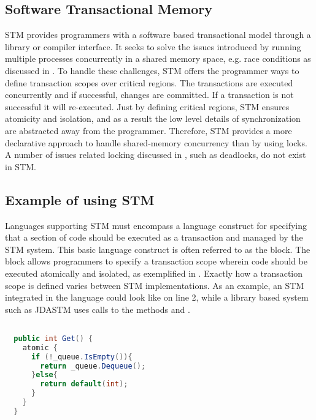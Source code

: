\subsection{Software Transactional Memory}
\ac{STM} provides programmers with a software based transactional model through a library or compiler interface\cite{herlihy2011tm}. It seeks to solve the issues introduced by running multiple processes concurrently in a shared memory space, e.g. race conditions as discussed in \cite[p. 22-26]{dpt907e14trending}. To handle these challenges, \ac{STM} offers the programmer ways to define transaction scopes over critical regions. The transactions are executed concurrently and if successful, changes are committed. If a transaction is not successful it will re-executed. Just by defining critical regions, \ac{STM} ensures atomicity and isolation, and as a result the low level details of synchronization are abstracted away from the programmer\cite[p. 48]{harris2005composable}. Therefore, \ac{STM} provides a more declarative approach to handle shared-memory concurrency than by using locks. A number of issues related locking discussed in \cite[p. 26-30]{dpt907e14trending}, such as deadlocks, do not exist in \ac{STM}.

\subsection{Example of using STM}
\label{sec:stm_keyconcepts_example}
Languages supporting \ac{STM} must encompass a language construct for specifying that a section of code should be executed as a transaction and managed by the \ac{STM} system. This basic language construct is often referred to as the  block\cite[p. 49]{harris2005composable}\cite[p. 3]{harris2003language}. The  block allows programmers to specify a transaction scope wherein code should be executed atomically and isolated, as exemplified in . Exactly how a transaction scope is defined varies between \ac{STM} implementations. As an example, an \ac{STM} integrated in the language could look like  on line 2, while a library based system such as JDASTM\cite{ramadan2009committing} uses calls to the methods  and .

\begin{lstlisting}[float, label=lst:stm_atomic_block,
 caption={Threadsafe queue},
 language=Java, 
 showspaces=false,
 showtabs=false,
 breaklines=true,
 showstringspaces=false,
 breakatwhitespace=true,
 commentstyle=\color{greencomments},
 keywordstyle=\color{bluekeywords},
 stringstyle=\color{redstrings},
 morekeywords={atomic, retry, orElse}]  % Start your code-block

  public int Get() {
    atomic {
      if (!_queue.IsEmpty()){
        return _queue.Dequeue();
      }else{
        return default(int);
      }
    }
  }
\end{lstlisting}

